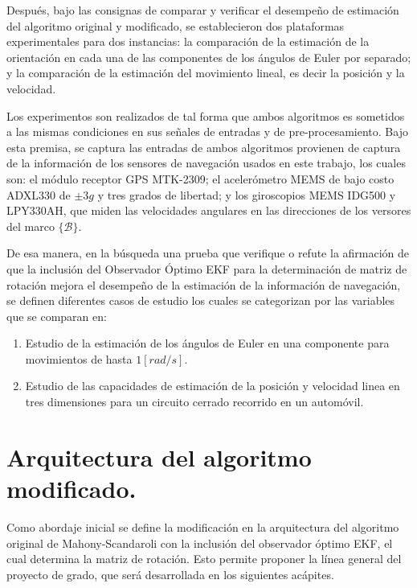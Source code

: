 \documentclass[10pt]{report}
\numberwithin{equation}{chapter}
\numberwithin{algorithm}{chapter}
\newcommand{\marco}[1]{\{\mathcal{#1}\}}
\begin{document}
Después, bajo las consignas de comparar y verificar el desempeño de estimación del algoritmo original y modificado, se establecieron dos plataformas experimentales para dos instancias: la comparación de la estimación de la orientación en cada una de las componentes de los ángulos de Euler por separado; y la comparación de la estimación del movimiento lineal, es decir la posición y la velocidad.\par
Los experimentos son realizados de tal forma que ambos algoritmos es sometidos a las mismas condiciones en sus señales de entradas y de pre-procesamiento. Bajo esta premisa, se captura las entradas de ambos algoritmos provienen de captura de la información de los sensores de navegación usados en este trabajo, los cuales son: el módulo receptor GPS MTK-2309; el acelerómetro MEMS de bajo costo ADXL330 de $\pm3g$ y tres grados de libertad; y los giroscopios MEMS IDG500 y LPY330AH, que miden las velocidades angulares en las direcciones de los versores del marco $\marco{B}$. \par
De esa manera, en la búsqueda una prueba que verifique o refute la afirmación de que la inclusión del Observador Óptimo EKF para la determinación de matriz de rotación mejora el desempeño de la estimación de la información de navegación, se definen diferentes casos de estudio los cuales se categorizan por las variables que se comparan en: 
\begin{enumerate}
\item Estudio de la estimación de los ángulos de Euler en una componente para movimientos de hasta $1[rad/s]$.
\item Estudio de las capacidades de estimación de la posición y velocidad linea en tres dimensiones para un circuito cerrado recorrido en un automóvil.
\end{enumerate}
\section{Arquitectura del algoritmo modificado.}
Como abordaje inicial se define la modificación en la arquitectura del algoritmo original de Mahony-Scandaroli con la inclusión del observador óptimo EKF, el cual determina la matriz de rotación. Esto permite proponer la línea general del proyecto de grado, que será desarrollada en los siguientes acápites. 
\end{document}
